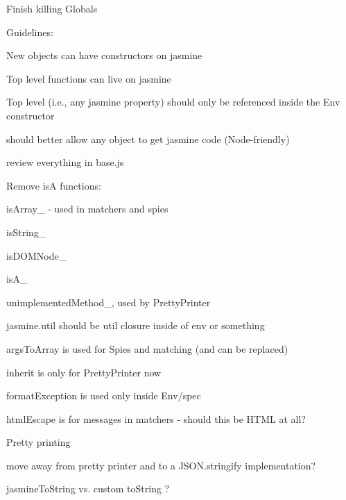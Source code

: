 \begin{DoxyItemize}
\item Finish killing Globals
\begin{DoxyItemize}
\item Guidelines\+:
\begin{DoxyItemize}
\item New objects can have constructors on {\ttfamily jasmine}
\item Top level functions can live on {\ttfamily jasmine}
\item Top level (i.\+e., any {\ttfamily jasmine} property) should only be referenced inside the {\ttfamily Env} constructor
\item should better allow any object to get jasmine code (Node-\/friendly)
\end{DoxyItemize}
\end{DoxyItemize}
\item review everything in base.\+js
\item Remove is\+A functions\+:
\begin{DoxyItemize}
\item is\+Array\+\_\+ -\/ used in matchers and spies
\item is\+String\+\_\+
\item is\+D\+O\+M\+Node\+\_\+
\item is\+A\+\_\+
\item unimplemented\+Method\+\_\+, used by Pretty\+Printer
\end{DoxyItemize}
\item jasmine.\+util should be util closure inside of env or something
\begin{DoxyItemize}
\item args\+To\+Array is used for Spies and matching (and can be replaced)
\item inherit is only for Pretty\+Printer now
\item format\+Exception is used only inside Env/spec
\item html\+Escape is for messages in matchers -\/ should this be H\+T\+M\+L at all?
\end{DoxyItemize}
\item Pretty printing
\begin{DoxyItemize}
\item move away from pretty printer and to a J\+S\+O\+N.\+stringify implementation?
\item jasmine\+To\+String vs. custom to\+String ?
\end{DoxyItemize}
\end{DoxyItemize}

